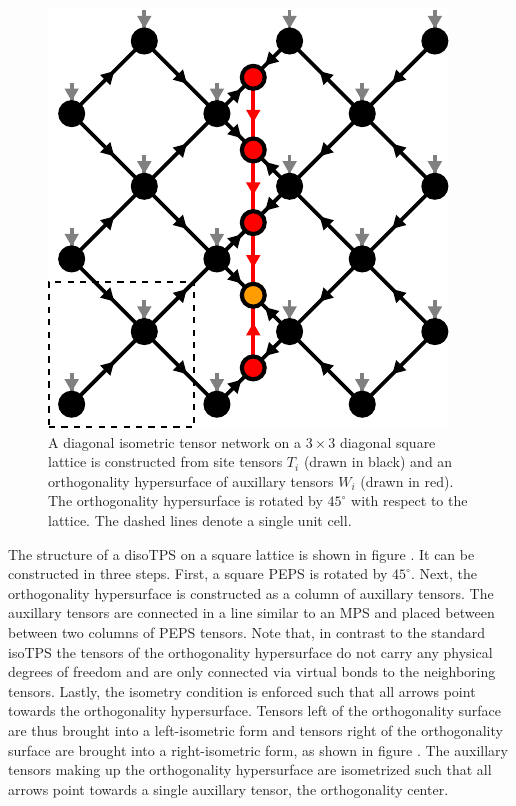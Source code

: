 \begin{figure}
	\centering
	\includegraphics[scale=1]{figures/tikz/disoTPS/disoTPS_structure/disoTPS_structure.pdf}
	\caption{A diagonal isometric tensor network on a $3\times3$ diagonal square lattice is constructed from site tensors $T_i$ (drawn in black) and an orthogonality hypersurface of auxillary tensors $W_i$ (drawn in red). The orthogonality hypersurface is rotated by $45^\circ$ with respect to the lattice. The dashed lines denote a single unit cell.}
	\label{fig:disoTPS_structure}
\end{figure}
The structure of a disoTPS on a square lattice is shown in figure . It can be constructed in three steps. First, a square PEPS is rotated by $45^\circ$. Next, the orthogonality hypersurface is constructed as a column of auxillary tensors. The auxillary tensors are connected in a line similar to an MPS and placed between between two columns of PEPS tensors. Note that, in contrast to the standard isoTPS the tensors of the orthogonality hypersurface do not carry any physical degrees of freedom and are only connected via virtual bonds to the neighboring tensors. Lastly, the isometry condition is enforced such that all arrows point towards the orthogonality hypersurface. Tensors left of the orthogonality surface are thus brought into a left-isometric form and tensors right of the orthogonality surface are brought into a right-isometric form, as shown in figure . The auxillary tensors making up the orthogonality hypersurface are isometrized such that all arrows point towards a single auxillary tensor, the orthogonality center. \par
